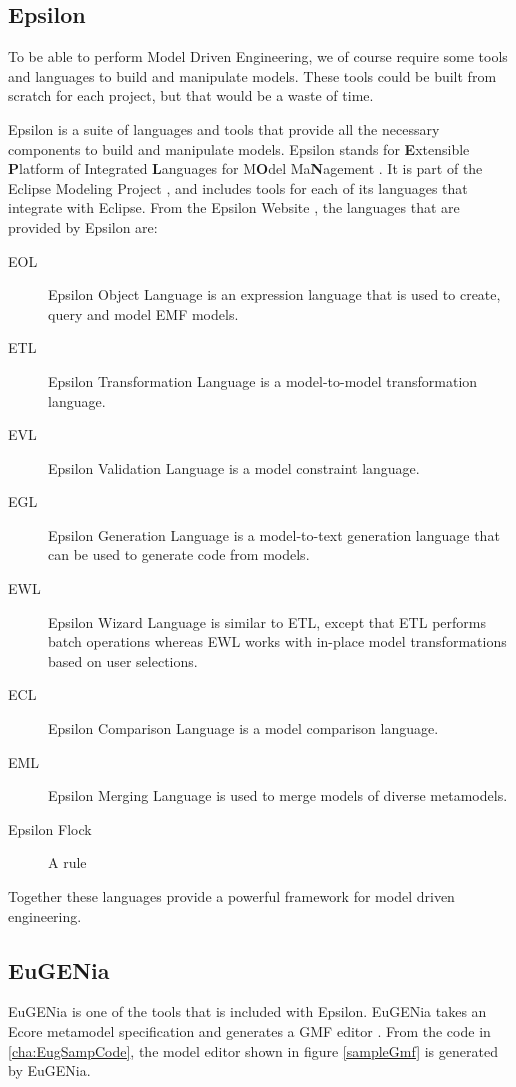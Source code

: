 \subsection{Epsilon}
To be able to perform Model Driven Engineering, we of course require some tools and languages to build and manipulate models. These tools could be built from scratch for each project, but that would be a waste of time.

Epsilon is a suite of languages and tools that provide all the necessary components to build and manipulate models. Epsilon stands for \textbf{E}xtensible \textbf{P}latform of Integrated \textbf{L}anguages for M\textbf{O}del Ma\textbf{N}agement \citep{epsilonWebsite}. It is part of the Eclipse Modeling Project \citep{ecliplseModelingProjectSite}, and includes tools for each of its languages that integrate with Eclipse. From the Epsilon Website \citep{epsilonWebsite}, the languages that are provided by Epsilon are:

\begin{description}
\item[EOL] Epsilon Object Language is an expression language that is used to create, query and model EMF models.
\item[ETL] Epsilon Transformation Language is a model-to-model transformation language.
\item[EVL] Epsilon Validation Language is a model constraint language.
\item[EGL] Epsilon Generation Language is a model-to-text generation language that can be used to generate code from models.
\item[EWL] Epsilon Wizard Language is similar to ETL, except that ETL performs batch operations whereas EWL works with in-place model transformations based on user selections.
\item[ECL] Epsilon Comparison Language is a model comparison language.
\item[EML] Epsilon Merging Language is used to merge models of diverse metamodels.
\item[Epsilon Flock] A rule
\end{description}

Together these languages provide a powerful framework for model driven engineering.

\subsection{EuGENia}
EuGENia is one of the tools that is included with Epsilon. EuGENia takes an Ecore metamodel specification and generates a GMF editor \citep{eugeniaSite}. From the code in \ref{cha:EugSampCode}, the model editor shown in figure \ref{sampleGmf} is generated by EuGENia.

